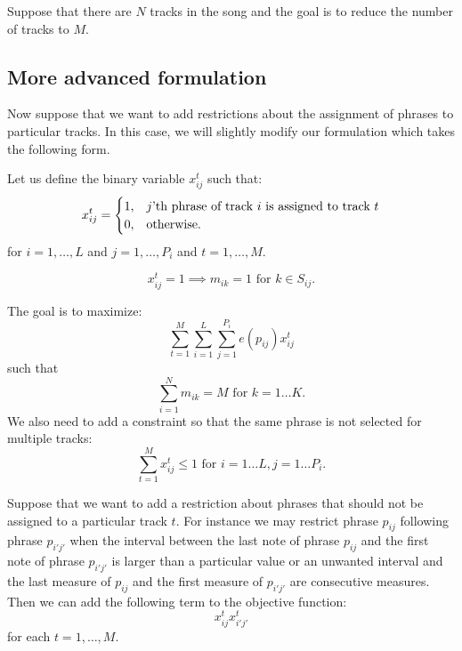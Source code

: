 \documentclass[11pt,a4paper]{article}
\begin{document}
Suppose that there are $ N $ tracks in the song and the goal is to reduce the number of tracks to $ M $.

 
 \subsection{More advanced formulation}
 
 Now suppose that we want to add restrictions about the assignment of phrases to particular tracks. In this case, we will slightly modify our formulation which takes the following form.
 
  Let us define the binary variable $x_{ij}^t$ such that:
 \begin{equation}
 x_{ij}^t =   \begin{cases}%
 1,      & \text{$j$'th phrase of track $i$ is assigned to track $ t $}\\
 0, & \text{otherwise.}
 \end{cases}
 \end{equation}
 for $ i = 1, \dots ,L $ and $ j=1, \dots ,P_i  $ and $ t = 1, \dots, M $.
 
\begin{equation}
 x_{ij}^t = 1 \implies m_{ik}=1 \mbox{ for } k \in S_{ij}.
 \end{equation}

 The goal is to maximize:
 \begin{equation}
 \sum_{t=1}^M \sum_{i=1}^L\sum_{j=1}^{P_i} e(p_{ij})x_{ij}^t
 \end{equation}
 such that
 \begin{equation}
 \sum_{i=1}^N m_{ik} = M \mbox{ for }k=1\dots K. 
 \end{equation} 
 We also need to add a constraint so that the same phrase is not selected for multiple tracks:
  \begin{equation}
 \sum_{t=1}^M x_{ij}^t \leq 1 \mbox{ for }i=1\dots L, j=1 \dots P_i. 
 \end{equation}
 
 Suppose that we want to add a restriction about phrases that should not be assigned to a particular track $ t $. For instance we may restrict phrase $ p_{ij} $ following phrase $ p_{i'j'} $ when the interval between the last note of phrase $ p_{ij} $ and the first note of phrase $p_{i'j'} $ is larger than a particular value or an unwanted interval and the last measure of $ p_{ij} $ and the first measure of $ p_{i'j'} $ are consecutive measures. Then we can add the following term to the objective function:
 \begin{equation}
 x_{ij}^tx_{i'j'}^t
 \end{equation} 
 for each $ t=1,\dots,M $.
 
\end{document}
